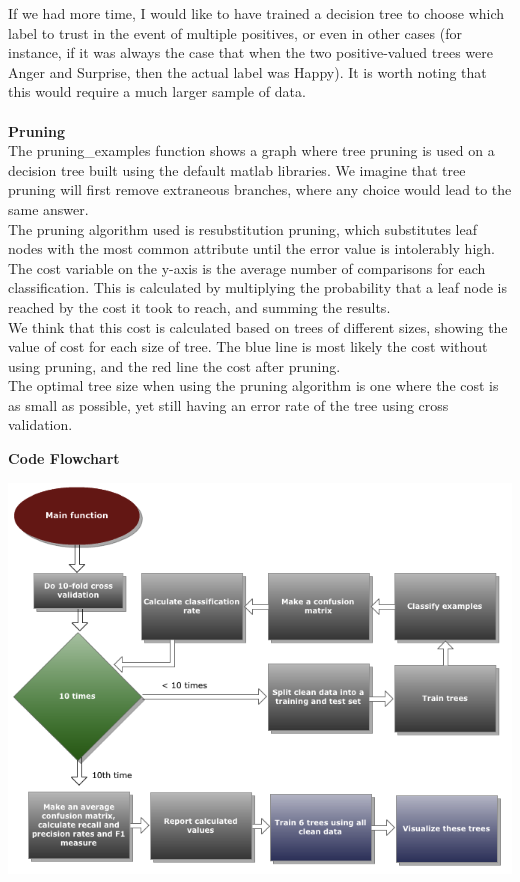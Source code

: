 \documentclass[12pt]{article}
\begin{document}
If we had more time, I would like to have trained a decision tree to choose which label to trust in the event of multiple positives, or even in other cases (for instance, if it was always the case that when the two positive-valued trees were Anger and Surprise, then the actual label was Happy). It is worth noting that this would require a much larger sample of data. \\ \\

{\bf Pruning} \\

The pruning\_examples function shows a graph where tree pruning is used on a decision tree built using the default matlab libraries. We imagine that tree pruning will first remove extraneous branches, where any choice would lead to the same answer. \\

The pruning algorithm used is resubstitution pruning, which substitutes leaf nodes with the most common attribute until the error value is intolerably high. \\

The cost variable on the y-axis is the average number of comparisons for each classification. This is calculated by multiplying the probability that a leaf node is reached by the cost it took to reach, and summing the results. \\

We think that this cost is calculated based on trees of different sizes, showing the value of cost for each size of tree. The blue line is most likely the cost without using pruning, and the red line the cost after pruning. \\

The optimal tree size when using the pruning algorithm is one where the cost is as small as possible, yet still having an error rate of the tree using cross validation. \\

\newpage

{\bf Code Flowchart} \\
\begin{center}
  \includegraphics[scale=0.6]{report-images/flowchart.png}
\end{center}
\end{document}
